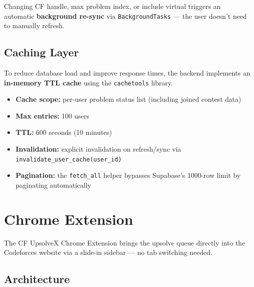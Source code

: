 \documentclass[11pt, a4paper]{article}
\begin{document}
\begin{infobox}
  Changing CF handle, max problem index, or include virtual triggers an
  automatic \textbf{background re-sync} via \texttt{BackgroundTasks} ---
  the user doesn't need to manually refresh.
\end{infobox}

\subsection{Caching Layer}

To reduce database load and improve response times, the backend implements
an \textbf{in-memory TTL cache} using the \texttt{cachetools} library.

\begin{itemize}
  \item \textbf{Cache scope:} per-user problem status list (including joined contest data)
  \item \textbf{Max entries:} 100 users
  \item \textbf{TTL:} 600 seconds (10 minutes)
  \item \textbf{Invalidation:} explicit invalidation on refresh/sync via
        \texttt{invalidate\_user\_cache(user\_id)}
  \item \textbf{Pagination:} the \texttt{fetch\_all} helper bypasses Supabase's
        1000-row limit by paginating automatically
\end{itemize}

\section{Chrome Extension}

The CF UpsolveX Chrome Extension brings the upsolve queue directly into
the Codeforces website via a slide-in sidebar --- no tab switching needed.

\subsection{Architecture}
\end{document}
